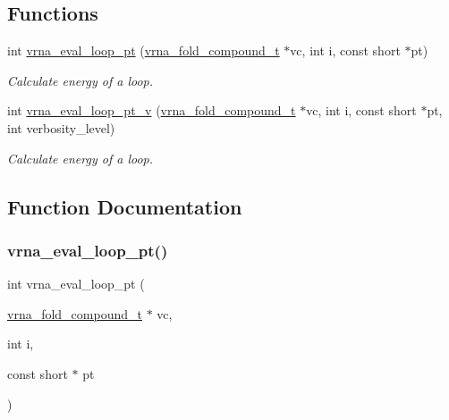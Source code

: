 \subsection*{Functions}
\begin{DoxyCompactItemize}
\item 
int \mbox{\hyperlink{group__eval__loops_ga730ba4df55c02fd530a0cddd49faf760}{vrna\+\_\+eval\+\_\+loop\+\_\+pt}} (\mbox{\hyperlink{group__fold__compound_ga1b0cef17fd40466cef5968eaeeff6166}{vrna\+\_\+fold\+\_\+compound\+\_\+t}} $\ast$vc, int i, const short $\ast$pt)
\begin{DoxyCompactList}\small\item\em Calculate energy of a loop. \end{DoxyCompactList}\item 
int \mbox{\hyperlink{group__eval__loops_ga30faecaff1009fe62c58312c8d56dabb}{vrna\+\_\+eval\+\_\+loop\+\_\+pt\+\_\+v}} (\mbox{\hyperlink{group__fold__compound_ga1b0cef17fd40466cef5968eaeeff6166}{vrna\+\_\+fold\+\_\+compound\+\_\+t}} $\ast$vc, int i, const short $\ast$pt, int verbosity\+\_\+level)
\begin{DoxyCompactList}\small\item\em Calculate energy of a loop. \end{DoxyCompactList}\end{DoxyCompactItemize}


\subsection{Function Documentation}
\mbox{\label{group__eval__loops_ga730ba4df55c02fd530a0cddd49faf760}} 
\subsubsection{\texorpdfstring{vrna\_eval\_loop\_pt()}{vrna\_eval\_loop\_pt()}}
{\footnotesize\ttfamily int vrna\+\_\+eval\+\_\+loop\+\_\+pt (\begin{DoxyParamCaption}\item[{\mbox{\hyperlink{group__fold__compound_ga1b0cef17fd40466cef5968eaeeff6166}{vrna\+\_\+fold\+\_\+compound\+\_\+t}} $\ast$}]{vc,  }\item[{int}]{i,  }\item[{const short $\ast$}]{pt }\end{DoxyParamCaption})}



